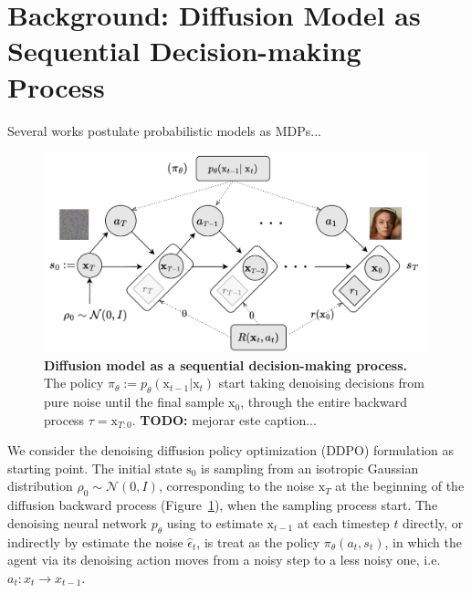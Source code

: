 \section{Background: Diffusion Model as Sequential Decision-making Process}

Several works postulate probabilistic models as MDPs...

\begin{figure}[ht]
  \centering
  \includegraphics[scale=0.85]{img/results/diffusion-model-MDP.png}
  \vspace{-4pt}  %
    \captionsetup{width=\textwidth} %
    \caption{\textbf{Diffusion model as a sequential decision-making process.} The policy
  $\pi_{\theta}:=p_{\theta}(\mathrm{x}_{t-1} | \mathrm{x}_{t})$ start taking denoising decisions from pure noise until the final sample $\mathrm{x}_0$, through the entire backward process $\tau=\mathrm{x}_{T:0}$. \textbf{TODO:} mejorar este caption...}
  \label{fig:diffusion-model-mdp}
\end{figure}

We consider the denoising diffusion policy optimization (DDPO) 
\cite{black2023training} formulation as starting point. The initial state
$\mathrm{s}_{0}$ is sampling from an isotropic Gaussian distribution
 $\rho_{0}\sim\mathcal{N}(0, I)$, corresponding to the noise
 $\mathrm{x}_{T}$ at the beginning of the diffusion backward process (Figure~\ref{fig:diffusion-model-mdp}), when the
sampling process start. The denoising neural network $p_{\theta}$ using to
estimate $\mathrm{x}_{t-1}$ at each timestep $t$ directly, or indirectly by
estimate the noise $\hat{\epsilon}_{t}$, is treat as the policy
$\pi_{\theta}(a_{t}, s_{t})$, in which the agent via its denoising action moves 
from a noisy step to a less noisy one, i.e. $a_t: x_{t} \rightarrow x_{t-1}$.

